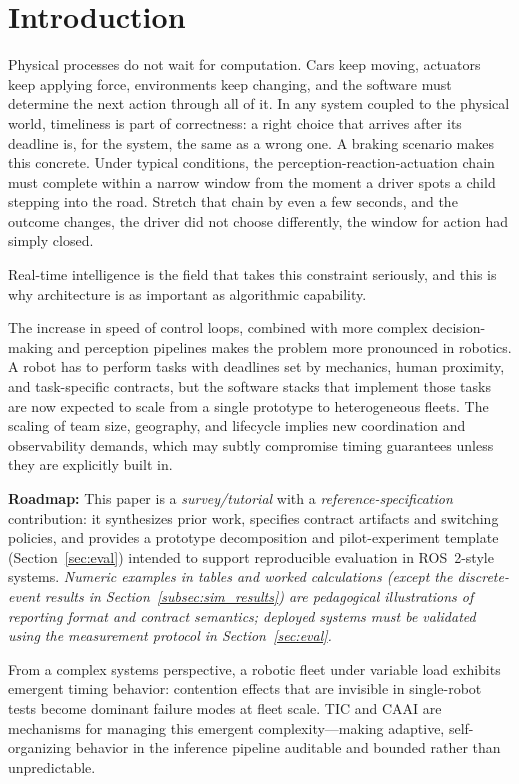 \documentclass[smallextended]{svjour3}
\begin{document}
\section{Introduction}
\label{sec:intro}
Physical processes do not wait for computation. Cars keep moving, actuators keep applying force, environments keep changing, and the software must determine the next action through all of it. In any system coupled to the physical world, timeliness is part of correctness: a right choice that arrives after its deadline is, for the system, the same as a wrong one. A braking scenario makes this concrete. Under typical conditions, the perception-reaction-actuation chain must complete within a narrow window from the moment a driver spots a child stepping into the road. Stretch that chain by even a few seconds, and the outcome changes, the driver did not choose differently, the window for action had simply closed.

Real-time intelligence is the field that takes this constraint seriously, and this is why architecture is as important as algorithmic capability.

The increase in speed of control loops, combined with more complex decision-making and perception pipelines makes the problem more pronounced in robotics. A robot has to perform tasks with deadlines set by mechanics, human proximity, and task-specific contracts, but the software stacks that implement those tasks are now expected to scale from a single prototype to heterogeneous fleets. The scaling of team size, geography, and lifecycle implies new coordination and observability demands, which may subtly compromise timing guarantees unless they are explicitly built in.

\medskip
\noindent\textbf{Roadmap:}\quad
This paper is a \emph{survey/tutorial} with a \emph{reference-specification} contribution: it synthesizes prior work, specifies contract artifacts and switching policies, and provides a prototype decomposition and pilot-experiment template (Section~\ref{sec:eval}) intended to support reproducible evaluation in ROS~2-style systems.
\textit{Numeric examples in tables and worked calculations (except the discrete-event results in Section~\ref{subsec:sim_results}) are pedagogical illustrations of reporting format and contract semantics; deployed systems must be validated using the measurement protocol in Section~\ref{sec:eval}.}

From a complex systems perspective, a robotic fleet under variable load exhibits emergent timing behavior: contention effects that are invisible in single-robot tests become dominant failure modes at fleet scale. TIC and CAAI are mechanisms for managing this emergent complexity---making adaptive, self-organizing behavior in the inference pipeline auditable and bounded rather than unpredictable.
\end{document}

